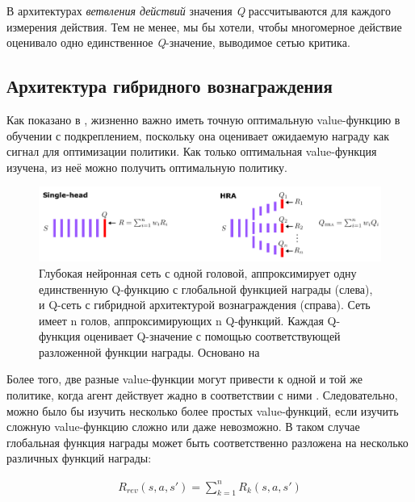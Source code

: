 В архитектурах \textit{ветвления действий} значения \textit{Q} рассчитываются для каждого измерения действия. Тем не менее, мы бы хотели, чтобы многомерное действие оценивало одно единственное \textit{Q}-значение, выводимое сетью критика.

\subsection{Архитектура гибридного вознаграждения}

Как показано в \cite{seijen2017hybrid}, жизненно важно иметь точную оптимальную value-функцию в обучении с подкреплением, поскольку она оценивает ожидаемую награду как сигнал для оптимизации политики. Как только оптимальная value-функция изучена, из неё можно получить оптимальную политику.

\begin{figure}[ht!]
    \center
    \includegraphics [scale=0.80] {my_folder/images/ch2/hybrid-reward.png}
    \caption{Глубокая нейронная сеть с одной головой, аппроксимирует одну единственную Q-функцию с глобальной функцией награды (слева), и Q-сеть с гибридной архитектурой вознаграждения (справа). Сеть имеет n голов, аппроксимирующих n Q-функций. Каждая Q-функция оценивает Q-значение с помощью соответствующей разложенной функции награды. Основано на \cite{seijen2017hybrid}}
    \label{fig:ch2-hybrid-reward}
\end{figure}

Более того, две разные value-функции могут привести к одной и той же политике, когда агент действует жадно в соответствии с ними \cite{seijen2017hybrid}. Следовательно, можно было бы изучить несколько более простых value-функций, если изучить сложную value-функцию сложно или даже невозможно. В таком случае глобальная функция награды может быть соответственно разложена на несколько различных функций награды:

\begin{equation}
    \begin{multlined}
        R_{rev}(s, a, s') = \sum^n_{k=1} R_k (s, a, s')
    \end{multlined}
\end{equation}

